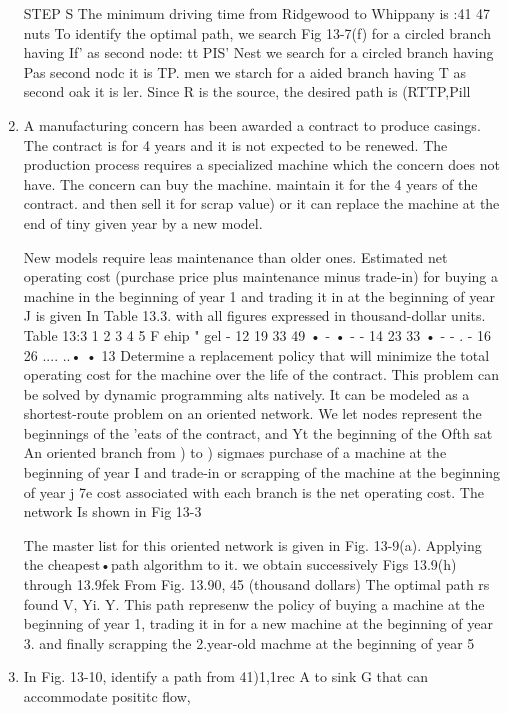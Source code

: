 \documentclass[11pt]{article} %
\begin{document}
\begin{enumerate}
STEP S The minimum driving time from Ridgewood to Whippany is :41 47 nuts To identify the optimal path, we search Fig 13-7(f) for a circled branch having If' as second node: tt PIS' Nest we search for a circled branch having Pas second nodc it is TP. men we starch for a aided branch having T as second oak it is ler. Since R is the source, the desired path is (RTTP,Pill 

\item  A manufacturing concern has been awarded a contract to produce casings. The contract is for 4 years and it is not expected to be renewed. The production process requires a specialized machine which the concern does not have. The concern can buy the machine. maintain it for the 4 years of the contract. and then sell it for scrap value) or it can replace the machine at the end of tiny given year by a new model. 

New models require leas maintenance than older ones. Estimated net operating cost (purchase price plus maintenance minus trade-in) for buying a machine in the beginning of year 1 and trading it in at the beginning of year J is given In Table 13.3. with all figures expressed in thousand-dollar units. 
Table 13:3 
1 2 3 4 5 F ehip " gel - 12 19 33 49 • - • - - 14 23 33 • - - . - 16 26 .... ..• • 13 
Determine a replacement policy that will minimize the total operating cost for the machine over the life of the contract. 
This problem can be solved by dynamic programming alts natively. It can be modeled as a shortest-route problem on an oriented network. We let nodes represent the beginnings of the 'eats of the contract, and Yt the beginning of the Ofth sat An oriented branch from ) to ) sigmaes purchase of a machine at the beginning of year I and trade-in or scrapping of the machine at the beginning of year j 7e cost associated with each branch is the net operating cost. The network Is shown in Fig 13-3 

The master list for this oriented network is given in Fig. 13-9(a). Applying the cheapest•path algorithm to it. we obtain successively Figs 13.9(h) through 13.9fek From Fig. 13.90, 
45 (thousand dollars) 
The optimal path rs found V, Yi. Y. This path represenw the policy of buying a machine at the beginning of year 1, trading it in for a new machine at the beginning of year 3. and finally scrapping the 2.year-old machme at the beginning of year 5 
\item  In Fig. 13-10, identify a path from 41)1,1rec A to sink G that can accommodate posititc flow, 


\end{enumerate}
\end{document}
